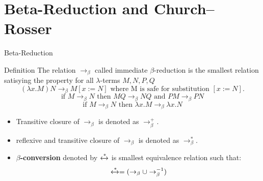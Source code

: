 \documentclass{beamer}
\begin{document}
  
  



\section{Beta-Reduction and Church–Rosser}
\begin{frame}{Beta-Reduction}
  \begin{block}{Definition}
    The relation \(\rightarrow_\beta\) called immediate $\beta$-reduction is the smallest relation satisying the property for all $\lambda$-terms \(M,N,P,Q\)
    \[
      (\lambda x.M)N \rightarrow_\beta M[x := N] \text{ where M is safe for substitution \([x := N]\).}
    \]
    \[
      \text{if } M \rightarrow_\beta N \text{ then } MQ \rightarrow_\beta NQ \text{ and } PM \rightarrow_\beta PN
    \]
    \[
      \text{if } M \rightarrow_\beta N \text{ then } \lambda x.M \rightarrow_\beta \lambda x.N
    \]
  \end{block}
  \begin{itemize}
    \item Transitive closure of $\rightarrow_\beta$ is denoted as $\rightarrow^+_\beta$.
    \item reflexive and transitive closure of $\rightarrow_\beta$ is denoted as $\rightarrow^*_\beta$.
    \item \textbf{\(\beta\)-conversion} denoted by $\xleftrightarrow{*}$ is smallest equivalence relation such that:
      \[
        \xleftrightarrow{*} = (\rightarrow_\beta \cup \rightarrow_\beta^{-1})
      \]
  \end{itemize}
  

\end{frame}
\end{document}
